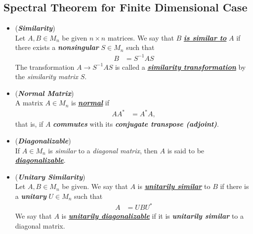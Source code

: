 \documentclass[11pt]{article}
\begin{document}
\subsection{Spectral Theorem for Finite Dimensional Case}
\begin{itemize}
\item \begin{definition} (\emph{\textbf{Similarity}}) \citep{horn2012matrix}\\
Let $A, B \in M_n$ be given $n\times n$ matrices. We say that $B$ \underline{\emph{\textbf{is similar to}}} $A$ if there exists a \emph{\textbf{nonsingular}} $S \in M_n$ such that
\begin{align*}
B &= S^{-1}A S
\end{align*}
The transformation $A \to S^{-1} A S$ is called a \underline{\emph{\textbf{similarity transformation}}} by the \emph{similarity matrix} $S$.
\end{definition}



\item \begin{definition}  (\emph{\textbf{Normal Matrix}}) \citep{horn2012matrix}\\
A matrix  $A \in M_n$ is \underline{\emph{\textbf{normal}}} if
\begin{align*}
A A^{*} &= A^{*} A,
\end{align*} that is, if $A$ \emph{\textbf{commutes}} with its \emph{\textbf{conjugate transpose (adjoint)}}.
\end{definition}

\item \begin{definition} (\emph{\textbf{Diagonalizable}}) \citep{horn2012matrix}\\
If $A \in M_n$ is \emph{similar} to a \emph{diagonal matrix}, then $A$ is said to be \underline{\emph{\textbf{diagonalizable}}}.
\end{definition}

\item \begin{definition} (\emph{\textbf{Unitary Similarity}}) \citep{horn2012matrix}\\
Let $A, B \in M_n$ be given. We say that $A$ is  \underline{\emph{\textbf{unitarily similar}}} to $B$ if there is a \emph{\textbf{unitary}} $U \in M_n$ such that
\begin{align*}
A &= U B U^{*} 
\end{align*} We say that $A$ is \underline{\emph{\textbf{unitarily diagonalizable}}} if it is \textbf{\emph{unitarily similar}} to a diagonal matrix.


\end{definition}
\end{itemize}
\end{document}
